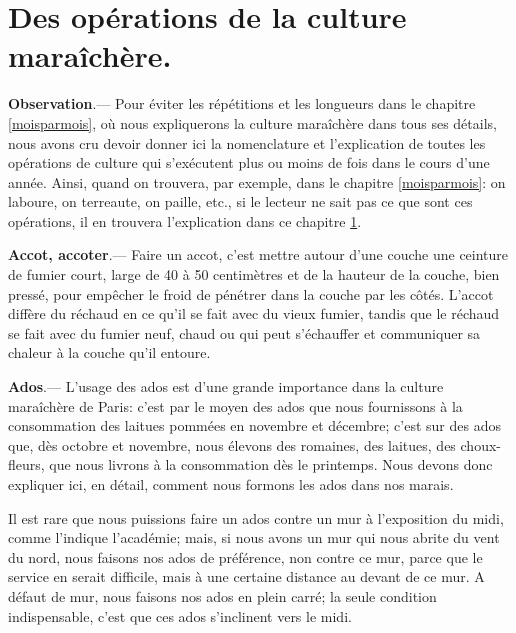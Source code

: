 \documentclass[10pt,a4paper]{book}
\begin{document}
\chapter{Des opérations de la culture maraîchère.}\label{operations}

{\small \textbf{Observation}.--- Pour éviter les répétitions et les longueurs dans le chapitre \ref{moisparmois}, où nous expliquerons la culture maraîchère dans tous ses détails, nous avons cru devoir donner ici la nomenclature et l'explication de toutes les opérations de culture qui s'exécutent plus ou moins de fois dans le cours d'une année. Ainsi, quand on trouvera, par exemple, dans le chapitre \ref{moisparmois}: on laboure, on terreaute, on paille, etc., si le lecteur ne sait pas ce que sont ces opérations, il en trouvera l'explication dans ce chapitre \ref{operations}.}

\textbf{Accot, accoter}.--- Faire un accot, c'est mettre autour d'une couche une ceinture de fumier court, large de 40 à 50 centimètres et de la hauteur de la couche, bien pressé, pour empêcher le froid de pénétrer dans la couche par les côtés. L'accot diffère du réchaud en ce qu'il se fait avec du vieux fumier, tandis que le réchaud se fait avec du fumier neuf, chaud ou qui peut s'échauffer et communiquer sa chaleur à la couche qu'il entoure.

\textbf{Ados}.--- L'usage des ados est d'une grande importance dans la culture maraîchère de Paris: c'est par le moyen des ados que nous fournissons à la consommation des laitues pommées en novembre et décembre; c'est sur des ados que, dès octobre et novembre, nous élevons des romaines, des laitues, des choux-fleurs, que nous livrons à la consommation dès le printemps. Nous devons donc expliquer ici, en détail, comment nous formons les ados dans nos marais.

Il est rare que nous puissions faire un ados contre un mur à l'exposition du midi, comme l'indique l'académie; mais, si nous avons un mur qui nous abrite du vent du nord, nous faisons nos ados de préférence, non contre ce mur, parce que le service en serait difficile, mais à une certaine distance au devant de ce mur. A défaut de mur, nous faisons nos ados en plein carré; la seule condition indispensable, c'est que ces ados s'inclinent vers le midi.
\end{document}
